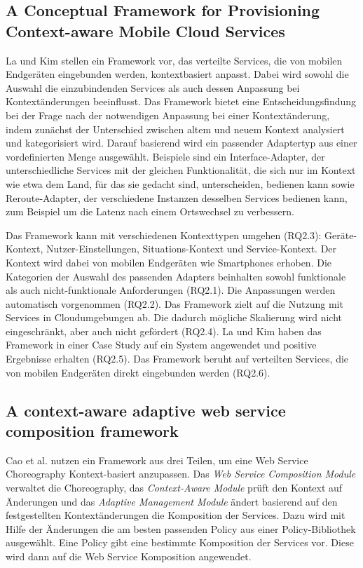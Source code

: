 \documentclass[conference,compsoc]{IEEEtran}
\begin{document}
\subsection{A Conceptual Framework for Provisioning Context-aware Mobile Cloud Services}
La und Kim \cite{LK10} stellen ein Framework vor, das verteilte Services, die von mobilen Endgeräten eingebunden werden, kontextbasiert anpasst. Dabei wird sowohl die Auswahl die einzubindenden Services als auch dessen Anpassung bei Kontextänderungen beeinflusst. Das Framework bietet eine Entscheidungsfindung bei der Frage nach der notwendigen Anpassung bei einer Kontextänderung, indem zunächst der Unterschied zwischen altem und neuem Kontext analysiert und kategorisiert wird. Darauf basierend wird ein passender Adaptertyp aus einer vordefinierten Menge ausgewählt. Beispiele sind ein Interface-Adapter, der unterschiedliche Services mit der gleichen Funktionalität, die sich nur im Kontext wie etwa dem Land, für das sie gedacht sind, unterscheiden, bedienen kann sowie Reroute-Adapter, der verschiedene Instanzen desselben Services bedienen kann, zum Beispiel um die Latenz nach einem Ortswechsel zu verbessern.

Das Framework kann mit verschiedenen Kontexttypen umgehen (RQ2.3): Geräte-Kontext, Nutzer-Einstellungen, Situations-Kontext und Service-Kontext. Der Kontext wird dabei von mobilen Endgeräten wie Smartphones erhoben. Die Kategorien der Auswahl des passenden Adapters beinhalten sowohl funktionale als auch nicht-funktionale Anforderungen (RQ2.1). Die Anpassungen werden automatisch vorgenommen (RQ2.2). Das Framework zielt auf die Nutzung mit Services in Cloudumgebungen ab. Die dadurch mögliche Skalierung wird nicht eingeschränkt, aber auch nicht gefördert (RQ2.4). La und Kim \cite{LK10} haben das Framework in einer Case Study auf ein System angewendet und positive Ergebnisse erhalten (RQ2.5). Das Framework beruht auf verteilten Services, die von mobilen Endgeräten direkt eingebunden werden (RQ2.6).

\subsection{A context-aware adaptive web service composition framework}
Cao et al. \cite{CZZ15} nutzen ein Framework aus drei Teilen, um eine Web Service Choreography Kontext-basiert anzupassen. Das \textit{Web Service Composition Module} verwaltet die Choreography, das \textit{Context-Aware Module} prüft den Kontext auf Änderungen und das \textit{Adaptive Management Module} ändert basierend auf den festgestellten Kontextänderungen die Komposition der Services. Dazu wird mit Hilfe der Änderungen die am besten passenden Policy aus einer Policy-Bibliothek ausgewählt. Eine Policy gibt eine bestimmte Komposition der Services vor. Diese wird dann auf die Web Service Komposition angewendet.
\end{document}
